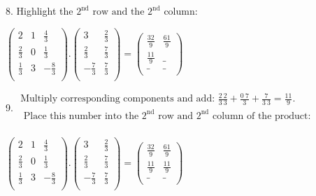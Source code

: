 \documentclass{article}
\begin{document}
8. Highlight the $2^{\text{nd}}\text{ row and the }2^{\text{nd}}$ column:

$\left(
        \begin{array}{ccc}
2           & 1 & \frac{4}{3}  \\
                \frac{2}{3} & 0 & \frac{1}{3}  \\
                \frac{1}{3} & 3 & -\frac{8}{3} \\
            \end{array}
        \right).\left(
        \begin{array}{cc}
3            & \frac{2}{3} \\
                \frac{2}{3}  & \frac{7}{3} \\
                -\frac{7}{3} & \frac{7}{3} \\
            \end{array}
        \right)=\left(
        \begin{array}{cc}
\frac{32}{9} & \frac{61}{9} \\
                \frac{11}{9} & \_           \\
                \_           & \_           \\
            \end{array}
        \right)$

9. $\begin{array}{l}
\text{Multiply corresponding components and add: }\frac{2\ 2}{3\ 3}+\frac{0\ 7}{3}+\frac{7}{3\ 3}=\frac{11}{9}.                        \\
\text{            Place this number into the }2^{\text{nd}}\text{ row and }2^{\text{nd}}\text{ column of the product}: \\
        \end{array}$

$\left(
        \begin{array}{ccc}
2           & 1 & \frac{4}{3}  \\
                \frac{2}{3} & 0 & \frac{1}{3}  \\
                \frac{1}{3} & 3 & -\frac{8}{3} \\
            \end{array}
        \right).\left(
        \begin{array}{cc}
3            & \frac{2}{3} \\
                \frac{2}{3}  & \frac{7}{3} \\
                -\frac{7}{3} & \frac{7}{3} \\
            \end{array}
        \right)=\left(
        \begin{array}{cc}
\frac{32}{9} & \frac{61}{9}          \\
                \frac{11}{9} & \frac{11}{9} \\
                \_           & \_                    \\
            \end{array}
        \right)$
\end{document}
